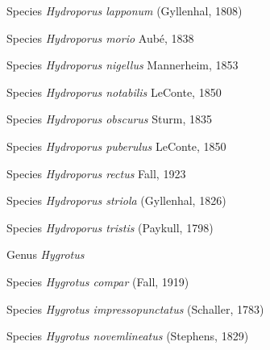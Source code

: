 \documentclass[9pt, article]{memoir}
\begin{document}
\begin{multicols}{2}
\vspace{6pt}\noindent\hspace{36pt}Species \textit{Hydroporus lapponum} (Gyllenhal, 1808)


\vspace{6pt}\noindent\hspace{36pt}Species \textit{Hydroporus morio} Aubé, 1838


\vspace{6pt}\noindent\hspace{36pt}Species \textit{Hydroporus nigellus} Mannerheim, 1853


\vspace{6pt}\noindent\hspace{36pt}Species \textit{Hydroporus notabilis} LeConte, 1850


\vspace{6pt}\noindent\hspace{36pt}Species \textit{Hydroporus obscurus} Sturm, 1835


\vspace{6pt}\noindent\hspace{36pt}Species \textit{Hydroporus puberulus} LeConte, 1850


\vspace{6pt}\noindent\hspace{36pt}Species \textit{Hydroporus rectus} Fall, 1923


\vspace{6pt}\noindent\hspace{36pt}Species \textit{Hydroporus striola} (Gyllenhal, 1826)


\vspace{6pt}\noindent\hspace{36pt}Species \textit{Hydroporus tristis} (Paykull, 1798)


\vspace{6pt}\noindent\hspace{30pt}Genus \textit{Hygrotus}


\vspace{6pt}\noindent\hspace{36pt}Species \textit{Hygrotus compar} (Fall, 1919)


\vspace{6pt}\noindent\hspace{36pt}Species \textit{Hygrotus impressopunctatus} (Schaller, 1783)


\vspace{6pt}\noindent\hspace{36pt}Species \textit{Hygrotus novemlineatus} (Stephens, 1829)



\end{multicols}
\end{document}
